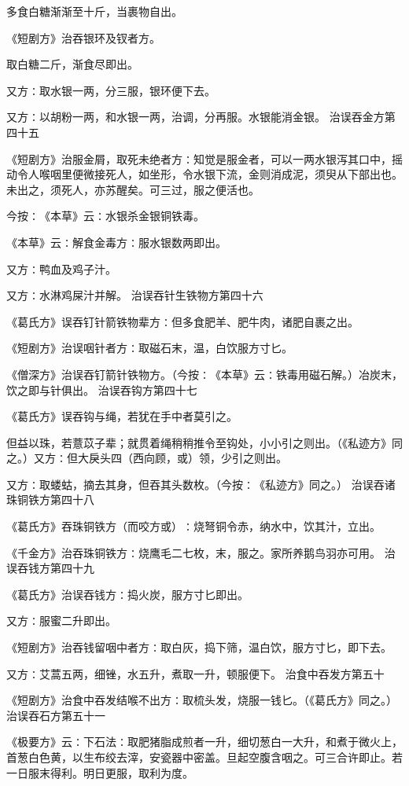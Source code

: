 \documentclass[a4paper,12pt,UTF8,twoside]{ctexbook}
\begin{document}
多食白糖渐渐至十斤，当裹物自出。

《短剧方》治吞银环及钗者方。

取白糖二斤，渐食尽即出。

又方∶取水银一两，分三服，银环便下去。

又方∶以胡粉一两，和水银一两，治调，分再服。水银能消金银。
治误吞金方第四十五

《短剧方》治服金屑，取死未绝者方∶知觉是服金者，可以一两水银泻其口中，摇动令人喉咽里便微接死人，如坐形，令水银下流，金则消成泥，须臾从下部出也。未出之，须死人，亦苏醒矣。可三过，服之便活也。

今按∶《本草》云∶水银杀金银铜铁毒。

《本草》云∶解食金毒方∶服水银数两即出。

又方∶鸭血及鸡子汁。

又方∶水淋鸡屎汁并解。
治误吞针生铁物方第四十六

《葛氏方》误吞钉针箭铁物辈方∶但多食肥羊、肥牛肉，诸肥自裹之出。

《短剧方》治误咽针者方∶取磁石末，温，白饮服方寸匕。

《僧深方》治误吞钉箭针铁物方。（今按∶《本草》云∶铁毒用磁石解。）冶炭末，饮之即与针俱出。
治误吞钩方第四十七

《葛氏方》误吞钩与绳，若犹在手中者莫引之。

但益以珠，若薏苡子辈；就贯着绳稍稍推令至钩处，小小引之则出。（《私迹方》同之。）又方∶但大戾头四（西向顾，或）领，少引之则出。

又方∶取蝼蛄，摘去其身，但吞其头数枚。（今按∶《私迹方》同之。）
治误吞诸珠铜铁方第四十八

《葛氏方》吞珠铜铁方（而咬方或）∶烧弩铜令赤，纳水中，饮其汁，立出。

《千金方》治吞珠铜铁方∶烧鹰毛二七枚，末，服之。家所养鹅鸟羽亦可用。
治误吞钱方第四十九

《葛氏方》治误吞钱方∶捣火炭，服方寸匕即出。

又方∶服蜜二升即出。

《短剧方》治吞钱留咽中者方∶取白灰，捣下筛，温白饮，服方寸匕，即下去。

又方∶艾蒿五两，细锉，水五升，煮取一升，顿服便下。
治食中吞发方第五十

《短剧方》治食中吞发结喉不出方∶取梳头发，烧服一钱匕。（《葛氏方》同之。）
治误吞石方第五十一

《极要方》云∶下石法∶取肥猪脂成煎者一升，细切葱白一大升，和煮于微火上，首葱白色黄，以生布绞去滓，安瓷器中密盖。旦起空腹含咽之。可三合许即止。若一日服末得利。明日更服，取利为度。
\end{document}
